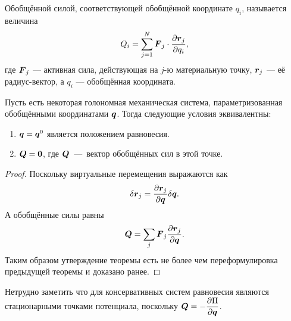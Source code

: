 \begin{reminder}
Обобщённой силой, соответствующей обобщённой координате \( q_i \), называется величина
\[
Q_i = \sum_{j=1}^N \boldsymbol{F}_j \cdot \frac{\partial \boldsymbol{r}_j}{\partial q_i},
\]
где \( \boldsymbol{F}_j \) — активная сила, действующая на \( j \)-ю материальную точку, \( \boldsymbol{r}_j \) — её радиус-вектор, а \( q_i \) — обобщённая координата.

\end{reminder}

\begin{theorem}
    Пусть есть некоторая голономная механическая система, параметризованная обобщёнными координатами $\boldsymbol{q}$.
    Тогда следующие условия эквивалентны:
    \begin{enumerate}
        \item $\boldsymbol{q} = \boldsymbol{q}^0$ является положением равновесия.
        \item $\boldsymbol{Q} = \boldsymbol{0}$, где $\boldsymbol{Q}$~---~вектор обобщённых сил в этой точке.
    \end{enumerate}
\end{theorem}
\begin{proof}
    Поскольку виртуальные перемещения выражаются как
    \[
        \delta \boldsymbol{r}_j = \dfrac{\partial \boldsymbol{r}_j}{\partial \boldsymbol{q}}\delta \boldsymbol{q}.
    \]
    А обобщённые силы равны
    \[
        \boldsymbol{Q} = \sum\limits_{j} \boldsymbol{F}_j \dfrac{\partial \boldsymbol{r}_j}{\partial \boldsymbol{q}}.
    \]
    Таким образом утверждение теоремы есть не более чем переформулировка предыдущей теоремы и доказано ранее.
\end{proof}
\begin{note}
    Нетрудно заметить что для консервативных систем равновесия являются стационарными точками потенциала, поскольку $\boldsymbol{Q} = -\dfrac{\partial \Pi}{\partial \boldsymbol{q}}$.
\end{note}